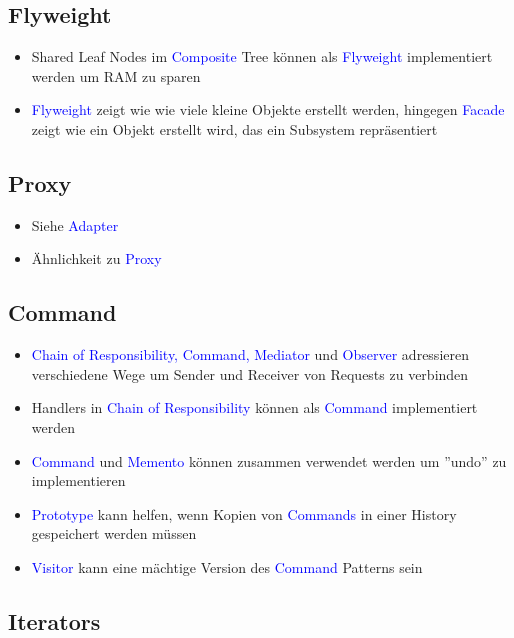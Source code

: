 \subsection{Flyweight}

\begin{itemize}
    \item Shared Leaf Nodes im \textcolor{blue}{Composite} Tree können als \textcolor{blue}{Flyweight} implementiert werden um RAM zu sparen
    \item \textcolor{blue}{Flyweight} zeigt wie wie viele kleine Objekte erstellt werden, hingegen \textcolor{blue}{Facade} zeigt wie ein Objekt erstellt wird, das ein Subsystem repräsentiert
\end{itemize}

\subsection{Proxy}

\begin{itemize}
    \item Siehe \textcolor{blue}{Adapter}
    \item Ähnlichkeit zu \textcolor{blue}{Proxy}
\end{itemize}

\subsection{Command}

\begin{itemize}
    \item \textcolor{blue}{Chain of Responsibility, Command, Mediator} und \textcolor{blue}{Observer} adressieren verschiedene Wege um Sender und Receiver von Requests zu verbinden
    \item Handlers in \textcolor{blue}{Chain of Responsibility} können als \textcolor{blue}{Command} implementiert werden
    \item \textcolor{blue}{Command} und \textcolor{blue}{Memento} können zusammen
    verwendet werden um ''undo'' zu implementieren
    \item \textcolor{blue}{Prototype} kann helfen, wenn Kopien von \textcolor{blue}{Commands} in einer History gespeichert werden müssen
    \item \textcolor{blue}{Visitor} kann eine mächtige Version des \textcolor{blue}{Command} Patterns sein
\end{itemize}

\subsection{Iterators}

